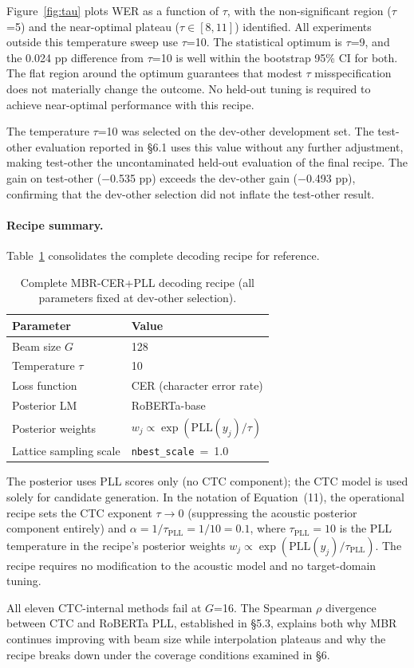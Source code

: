 Figure~\ref{fig:tau} plots WER as a function of $\tau$, with the non-significant region ($\tau$=5) and the
near-optimal plateau ($\tau \in [8, 11]$) identified. All experiments outside this temperature sweep use
$\tau$=10. The statistical optimum is $\tau$=9, and the 0.024 pp difference from $\tau$=10 is well
within the bootstrap 95\% CI for both. The flat region around the optimum guarantees that modest
$\tau$ misspecification does not materially change the outcome. No held-out tuning is required to
achieve near-optimal performance with this recipe.

The temperature $\tau$=10 was selected on the dev-other development set. The test-other evaluation
reported in §6.1 uses this value without any further adjustment, making test-other the
uncontaminated held-out evaluation of the final recipe. The gain on test-other ($-$0.535 pp) exceeds
the dev-other gain ($-$0.493 pp), confirming that the dev-other selection did not inflate the
test-other result.

\paragraph{Recipe summary.}
Table~\ref{tab:recipe} consolidates the complete decoding recipe for reference.

\begin{table}[h]
\centering
\small
\caption{Complete MBR-CER+PLL decoding recipe (all parameters fixed at dev-other selection).}
\label{tab:recipe}
\begin{tabular}{ll}
\hline
Parameter & Value \\
\hline
Beam size $G$ & 128 \\
Temperature $\tau$ & 10 \\
Loss function & CER (character error rate) \\
Posterior LM & RoBERTa-base \cite{liu2019roberta} \\
Posterior weights & $w_j \propto \exp(\mathrm{PLL}(y_j) / \tau)$ \\
Lattice sampling scale & \texttt{nbest\_scale}~=~1.0 \\
\hline
\end{tabular}
\end{table}

The posterior uses PLL scores only (no CTC component); the CTC model is used solely for candidate generation. In the notation of Equation~(11), the operational recipe sets the CTC exponent $\tau \to 0$ (suppressing the acoustic posterior component entirely) and $\alpha = 1/\tau_\text{PLL} = 1/10 = 0.1$, where $\tau_\text{PLL} = 10$ is the PLL temperature in the recipe's posterior weights $w_j \propto \exp(\text{PLL}(y_j)/\tau_\text{PLL})$. The recipe requires no modification to the acoustic model and no target-domain tuning.



All eleven CTC-internal methods fail at $G$=16. The Spearman $\rho$ divergence between CTC and RoBERTa PLL, established in §5.3, explains both why MBR continues improving with beam size while interpolation plateaus and why the recipe breaks down under the coverage conditions examined in §6.




